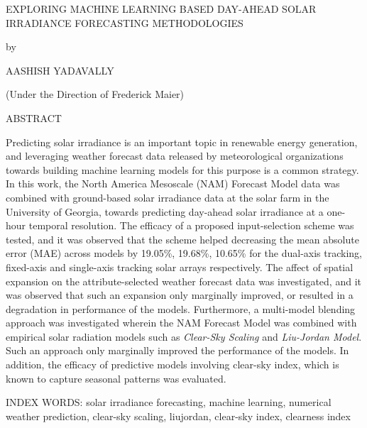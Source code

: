 \thispagestyle{empty}
\begin{center}
    EXPLORING MACHINE LEARNING BASED DAY-AHEAD SOLAR IRRADIANCE FORECASTING METHODOLOGIES
    
    by
    
    AASHISH YADAVALLY
    
    (Under the Direction of Frederick Maier)
    
    ABSTRACT
\end{center}

Predicting solar irradiance is an important topic in renewable energy generation, and leveraging weather forecast data released by meteorological organizations towards building machine learning models for this purpose is a common strategy. In this work, the North America Mesoscale (NAM) Forecast Model data was combined with ground-based solar irradiance data at the solar farm in the University of Georgia, towards predicting day-ahead solar irradiance at a one-hour temporal resolution. The efficacy of a proposed input-selection scheme was tested, and it was observed that the scheme helped decreasing the mean absolute error (MAE) across models by 19.05\%, 19.68\%, 10.65\% for the dual-axis tracking, fixed-axis and single-axis tracking solar arrays respectively. The affect of spatial expansion on the attribute-selected weather forecast data was investigated, and it was observed that such an expansion only marginally improved, or resulted in a degradation in performance of the models. Furthermore, a multi-model blending approach was investigated wherein the NAM Forecast Model was combined with empirical solar radiation models such as \textit{Clear-Sky Scaling} and \textit{Liu-Jordan Model}. Such an approach only marginally improved the performance of the models. In addition, the efficacy of predictive models involving clear-sky index, which is known to capture seasonal patterns was evaluated.

\vspace{\baselineskip}
\noindent
INDEX WORDS: solar irradiance forecasting, machine learning, numerical weather prediction, clear-sky scaling, liujordan, clear-sky index, clearness index

\newpage